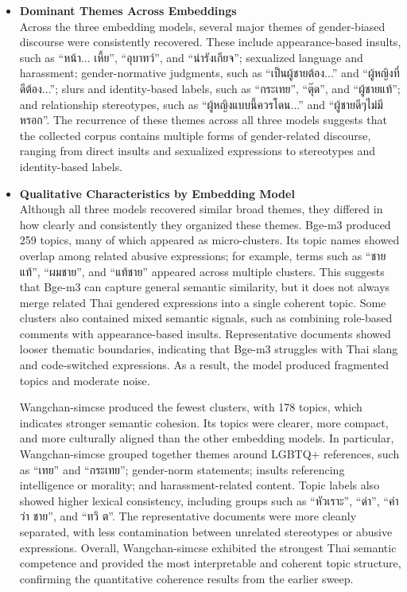 \documentclass[12pt,oneside,openright,a4paper]{cpe-english-project}
\begin{document}
\begin{itemize}
\item \textbf{Dominant Themes Across Embeddings}\\
Across the three embedding models, several major themes of gender-biased discourse were consistently recovered. These include appearance-based insults, such as ``หน้า... เหี้ย'', ``อุบาทว์'', and ``น่ารังเกียจ''; sexualized language and harassment; gender-normative judgments, such as ``เป็นผู้ชายต้อง...'' and ``ผู้หญิงที่ดีต้อง...''; slurs and identity-based labels, such as ``กระเทย'', ``ตุ๊ด'', and ``ผู้ชายแท้''; and relationship stereotypes, such as ``ผู้หญิงแบบนี้ควรโดน...'' and ``ผู้ชายดีๆไม่มีหรอก''. The recurrence of these themes across all three models suggests that the collected corpus contains multiple forms of gender-related discourse, ranging from direct insults and sexualized expressions to stereotypes and identity-based labels.

\item \textbf{Qualitative Characteristics by Embedding Model}\\
Although all three models recovered similar broad themes, they differed in how clearly and consistently they organized these themes. Bge-m3 produced 259 topics, many of which appeared as micro-clusters. Its topic names showed overlap among related abusive expressions; for example, terms such as ``ชายแท้'', ``ผมชาย'', and ``แท้ชาย'' appeared across multiple clusters. This suggests that Bge-m3 can capture general semantic similarity, but it does not always merge related Thai gendered expressions into a single coherent topic. Some clusters also contained mixed semantic signals, such as combining role-based comments with appearance-based insults. Representative documents showed looser thematic boundaries, indicating that Bge-m3 struggles with Thai slang and code-switched expressions. As a result, the model produced fragmented topics and moderate noise.

Wangchan-simcse produced the fewest clusters, with 178 topics, which indicates stronger semantic cohesion. Its topics were clearer, more compact, and more culturally aligned than the other embedding models. In particular, Wangchan-simcse grouped together themes around LGBTQ+ references, such as ``เทย'' and ``กระเทย''; gender-norm statements; insults referencing intelligence or morality; and harassment-related content. Topic labels also showed higher lexical consistency, including groups such as ``หัวเราะ'', ``ด่า'', ``คำว่า ชาย'', and ``ทวิ ต''. The representative documents were more cleanly separated, with less contamination between unrelated stereotypes or abusive expressions. Overall, Wangchan-simcse exhibited the strongest Thai semantic competence and provided the most interpretable and coherent topic structure, confirming the quantitative coherence results from the earlier sweep.


\end{itemize}
\end{document}

